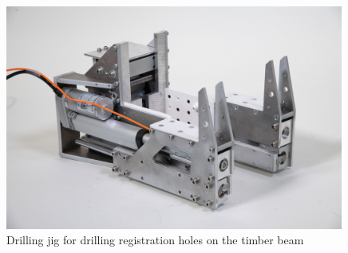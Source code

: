 \begin{figure}
    \centering
    \includegraphics[width=0.99\textwidth]{images/04-3/cl1-completed.jpg}
    \caption{Drilling jig for drilling registration holes on the timber beam}
    \label{fig:integrated-cl1-photo}
\end{figure}

